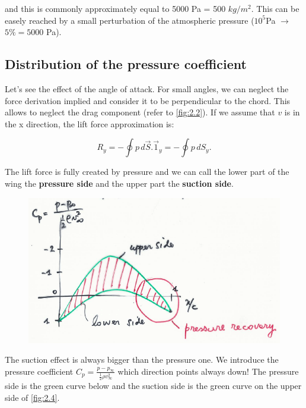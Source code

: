 		and this is commonly approximately equal to 5000 Pa = 500 $kg/m^2$. This can be easely reached by a small perturbation of the atmospheric pressure ($10^5$Pa $\rightarrow$ $5\% = 5000$ Pa). \\
		
		\subsection{Distribution of the pressure coefficient}
			Let's see the effect of the angle of attack. For small angles, we can neglect the force derivation implied and consider it to be perpendicular to the chord. This allows to neglect the drag component (refer to \autoref{fig:2.2}). If we assume that $v$ is in the x direction, the lift force approximation is:
			
			\begin{equation}
			R_y = - \oint p \, d\vec{S}.\vec{1}_y = - \oint p \, dS_y.
			\end{equation}						
			 
			The lift force is fully created by pressure and we can call the lower part of the wing the \textbf{pressure side} and the upper part the \textbf{suction side}. 
			
			\begin{figure}
			\vspace{-5mm}
			\includegraphics[scale=0.3]{ch2/4}
			\label{fig:2.4}
			\end{figure}
			The suction effect is always bigger than the pressure one. We introduce the pressure coefficient $C_p = \frac{p-p_\infty}{\frac{1}{2}\rho v_\infty ^2}$ which direction points always down! The pressure side is the green curve below and the suction side is the green curve on the upper side of \autoref{fig:2.4}. \\

